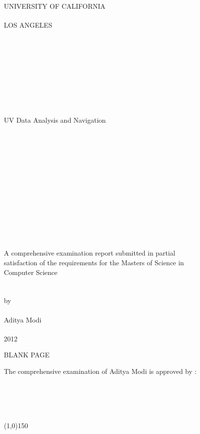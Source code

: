 \documentclass[12pt,fullpage,doublespace]{article}
\begin{document}
\begin{center}
UNIVERSITY OF CALIFORNIA\\
\mbox{}\\
LOS ANGELES\\
\mbox{}\\
\mbox{}\\
\mbox{}\\
\mbox{}\\
\mbox{}\\
\mbox{}\\
\mbox{}\\
\mbox{}\\
\mbox{}\\
{\large UV Data Analysis and Navigation}\\
\mbox{}\\
\mbox{}\\
\mbox{}\\
\mbox{}\\
\mbox{}\\
\mbox{}\\
\mbox{}\\
\mbox{}\\
\mbox{}\\
\mbox{}\\
\mbox{}\\
\mbox{}\\
\mbox{}\\
A comprehensive examination report submitted in partial\\
satisfaction of the requirements for the Masters of Science in\\
Computer Science\\
\mbox{}\\
\mbox{}\\
by
\mbox{}\\
\mbox{}\\
Aditya Modi
\mbox{}\\
\mbox{}\\
\mbox{2012}\\
\end{center}
\newpage
\begin{center}
BLANK PAGE
\end{center}
\newpage
The comprehensive examination of Aditya Modi is approved by :\\
\mbox{}\\
\mbox{}\\
\mbox{}\\
\mbox{}\\
\begin{center}
\end{center}
\hfill\line(1,0){150}\\
\end{document}
